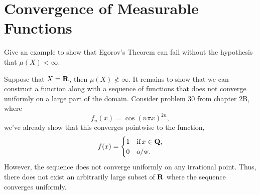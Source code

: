 \documentclass[11pt,oneside]{book}
\begin{document}
\section{Convergence of Measurable Functions}
\begin{exercise}
    Give an example to show that Egorov's Theorem can fail without the hypothesis that $\mu(X) < \infty$.
\end{exercise}
\begin{solution}
    Suppose that $X = \mathbf{R}$, then $\mu(X) \not< \infty$. It remains to
    show that we can construct a function along with a sequence of functions
    that does not converge uniformly on a large part of the domain. Consider
    problem 30 from chapter 2B, where 
    \[
        f_n(x) = \cos(n\pi x)^{2n},    
    \]
    we've already show that this converges pointwise to the function,
    \[
        f(x) = \begin{cases} 1 &\text{if}\, x\in\mathbf{Q}, \\ 0&\text{o/w.}\end{cases}  
    \]
    However, the sequence does not converge uniformly on any irrational point.
    Thus, there does not exist an arbitrarily large subset of $\mathbf{R}$ where the
    sequence converges uniformly. 
\end{solution}
\end{document}
